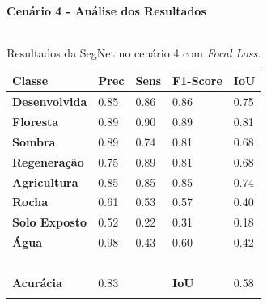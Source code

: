 \documentclass[%
  10pt,%
  aspectratio = 169,%
  compress,%
  t,%
  english,%
  brazilian,%
  tikz,
]{beamer}
\begin{document}
\begin{frame}
\framesubtitle{Cenário 4 - Análise dos Resultados}

\begin{columns}[T]

\begin{table}[!ht]
    \centering
    \caption{Resultados da SegNet no cenário 4 com \textit{Focal Loss}.}%
    \label{tab:res:cen41}%
    \begin{tabular}{lllll}
    \toprule
        \textbf{Classe} & \textbf{Prec} & \textbf{Sens} & \textbf{F1-Score} & \textbf{IoU} \\
        \midrule
        \textbf{Desenvolvida}   & 0.85 & 0.86 & 0.86 & 0.75  \\ 
        \textbf{Floresta}       & 0.89 & 0.90 & 0.89 & 0.81  \\ 
        \textbf{Sombra}         & 0.89 & 0.74 & 0.81 & 0.68  \\ 
        \textbf{Regeneração}    & 0.75 & 0.89 & 0.81 & 0.68  \\ 
        \textbf{Agricultura}    & 0.85 & 0.85 & 0.85 & 0.74  \\ 
        \textbf{Rocha}          & 0.61 & 0.53 & 0.57 & 0.40  \\ 
        \textbf{Solo Exposto}   & 0.52 & 0.22 & 0.31 & 0.18  \\ 
        \textbf{Água}           & 0.98 & 0.43 & 0.60 & 0.42 \\ 
        \textbf{} & ~ & ~ & ~ & ~ \\ 
        \textbf{Acurácia} & 0.83 & ~ & \textbf{IoU} & 0.58 \\
        \bottomrule
        \addlinespace
    \end{tabular}
\end{table}



\end{columns}
\end{frame}
\end{document}
